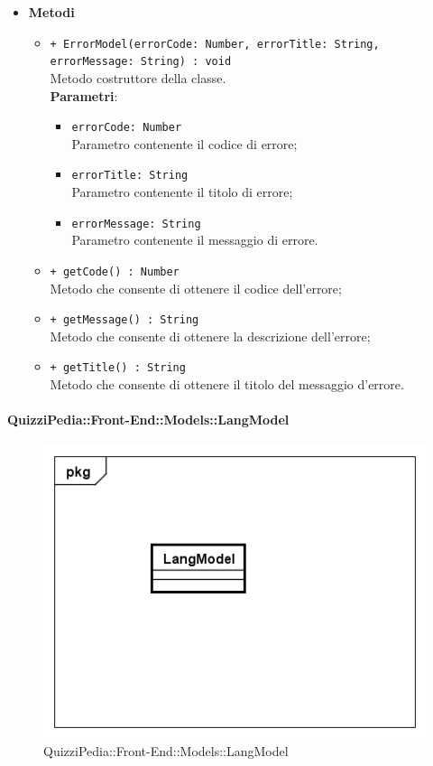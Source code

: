 \begin{itemize}
			\item \textbf{Metodi}
			\begin{itemize}
				\item \texttt{+ ErrorModel(errorCode: Number, errorTitle: String, errorMessage: String) : void} \\
				Metodo costruttore della classe.\\
				\textbf{Parametri}: 
				\begin{itemize}
					\item \texttt{errorCode: Number} \\
					Parametro contenente il codice di errore;
					\item \texttt{errorTitle: String} \\
					Parametro contenente il titolo di errore;
					\item \texttt{errorMessage: String} \\
					Parametro contenente il messaggio di errore.
				\end{itemize}
				\item \texttt{+ getCode() : Number} \\
				Metodo che consente di ottenere il codice dell'errore;
				\item \texttt{+ getMessage() : String} \\
				Metodo che consente di ottenere la descrizione dell'errore;
				\item \texttt{+ getTitle() : String} \\
				Metodo che consente di ottenere il titolo del messaggio d'errore. 
			\end{itemize}
		\end{itemize}
			
		\paragraph{QuizziPedia::Front-End::Models::LangModel}
		
		\label{QuizziPedia::Front-End::Models::LangModel}
		
		\begin{figure}[ht]
			\centering
			\includegraphics[scale=0.5,keepaspectratio]{UML/Classi/Front-End/QuizziPedia_Front-end_Models_LangModel.png}
			\caption{QuizziPedia::Front-End::Models::LangModel}
		\end{figure} \FloatBarrier
		
